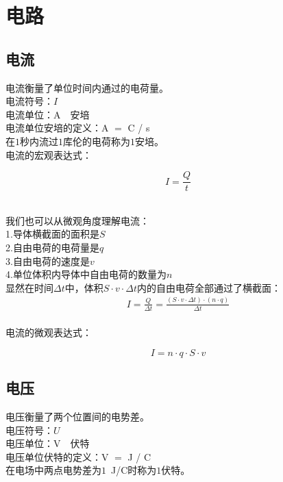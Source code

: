 \documentclass[UTF8]{ctexart}
\begin{document}
\newpage

\section{电路}

\subsection{电流}
    电流衡量了单位时间内通过的电荷量。\\[4mm]
    电流符号：$I$\\[1mm]
    电流单位：A~~安培\\[4mm]
    电流单位安培的定义：A $=$ C / s\\[1mm]
    在$1$秒内流过$1$库伦的电荷称为$1$安培。\\[3mm]
    电流的宏观表达式：
    \begin{large}
        \begin{equation*}
            I=\frac{Q}{t}
        \end{equation*}
    \end{large}\\
    我们也可以从微观角度理解电流：\\[3mm]
    1.导体横截面的面积是$S$\\[2mm]
    2.自由电荷的电荷量是$q$\\[2mm]
    3.自由电荷的速度是$v$\\[2mm]
    4.单位体积内导体中自由电荷的数量为$n$\\[5mm]
    显然在时间$\Delta t$中，体积$S\cdot v\cdot\Delta t$内的自由电荷全部通过了横截面：\vspace{8pt}
    \setcounter{equation}{0}
    \begin{align}
        I=\frac{Q}{\Delta t}=\frac{(S\cdot v\cdot \Delta t)\cdot(n\cdot q)}{\Delta t}
    \end{align}\\
    电流的微观表达式：
    \begin{large}
        \begin{equation*}
            I=n\cdot q\cdot S\cdot v
        \end{equation*}
    \end{large}

\subsection{电压}
    电压衡量了两个位置间的电势差。\\[4mm]
    电压符号：$U$\\[1mm]
    电压单位：V~~伏特\\[4mm]
    电压单位伏特的定义：V $=$ J / C\\[1mm]
    在电场中两点电势差为$1$~J/C时称为$1$伏特。
\end{document}
